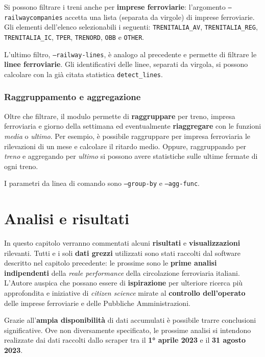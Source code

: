 \documentclass[12pt,a4paper,italian]{report}
\begin{document}
Si possono filtrare i treni anche per \textbf{imprese ferroviarie}:
l'argomento \texttt{--railway\-companies} accetta una lista (separata
da virgole) di imprese ferroviarie.  Gli elementi dell'elenco
selezionabili i seguenti: \texttt{TRENITALIA\_\-AV},
\texttt{TRENITALIA\_\-REG}, \texttt{TRENITALIA\_\-IC}, \texttt{TPER},
\texttt{TRENORD}, \texttt{OBB} e \texttt{OTHER}.

L'ultimo filtro, \texttt{--railway\--lines}, è analogo al precedente e
permette di filtrare le \textbf{linee ferroviarie}.  Gli
identificativi delle linee, separati da virgola, si possono calcolare
con la già citata statistica \texttt{detect\-\_lines}.

\subsection{Raggruppamento e aggregazione}

Oltre che filtrare, il modulo permette di \textbf{raggruppare} per
treno, impresa ferroviaria e giorno della settimana ed eventualmente
\textbf{riaggregare} con le funzioni \textit{media} o \textit{ultimo}.
Per esempio, è possibile raggruppare per impresa ferroviaria le
rilevazioni di un mese e calcolare il ritardo medio.  Oppure,
raggruppando per \textit{treno} e aggregando per \textit{ultimo} si
possono avere statistiche sulle ultime fermate di ogni treno.

I parametri da linea di comando sono \texttt{--group\--by} e
\texttt{--agg\--func}.

\chapter{Analisi e risultati}
\label{analisi}

In questo capitolo verranno commentati alcuni \textbf{risultati} e
\textbf{visualizzazioni} rilevanti.  Tutti e i soli \textbf{dati
    grezzi} utilizzati sono stati raccolti dal software descritto nel
capitolo precedente: le prossime sono le \textbf{prime analisi
    indipendenti} della \textit{reale performance} della circolazione
ferroviaria italiani.  L'Autore auspica che possano essere di
\textbf{ispirazione} per ulteriore ricerca più approfondita e
iniziative di \textit{citizen science} mirate al \textbf{controllo
    dell'operato} delle imprese ferroviarie e delle Pubbliche
Amministrazioni.

Grazie all'\textbf{ampia disponibilità} di dati accumulati è possibile
trarre conclusioni significative.  Ove non diversamente specificato,
le prossime analisi si intendono realizzate dai dati raccolti dallo
scraper tra il \textbf{1° aprile 2023} e il \textbf{31 agosto 2023}.
\end{document}
